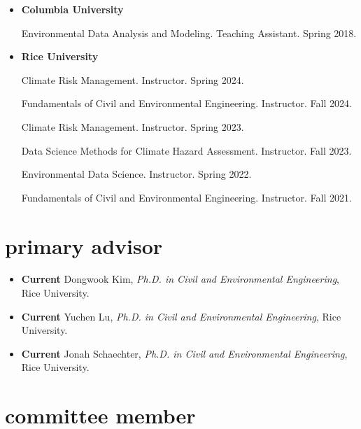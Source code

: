 \documentclass[10pt,oneside]{article}
\begin{document}
\begin{itemize}[label={}]

  \item \textbf{Columbia University}

        Environmental Data Analysis and Modeling. Teaching Assistant. Spring 2018.


  \item \textbf{Rice University}

        Climate Risk Management. Instructor. Spring 2024.

        Fundamentals of Civil and Environmental Engineering. Instructor. Fall 2024.

        Climate Risk Management. Instructor. Spring 2023.

        Data Science Methods for Climate Hazard Assessment. Instructor. Fall 2023.

        Environmental Data Science. Instructor. Spring 2022.

        Fundamentals of Civil and Environmental Engineering. Instructor. Fall 2021.


\end{itemize}


\section{primary advisor}

\mbox{}\vspace{-\dimexpr\baselineskip\relax}

\begin{itemize}[label={}]


  \item \textbf{Current} Dongwook Kim, \textit{Ph.D. in Civil and Environmental Engineering}, Rice University.

  \item \textbf{Current} Yuchen Lu, \textit{Ph.D. in Civil and Environmental Engineering}, Rice University.

  \item \textbf{Current} Jonah Schaechter, \textit{Ph.D. in Civil and Environmental Engineering}, Rice University.



\end{itemize}


\section{committee member}
\end{document}
